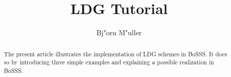 \documentclass[11pt,twoside,a4paper]{fdyartcl}
\title{LDG Tutorial}
\author{Bj"orn M"uller}
\begin{document}
\maketitle

\begin{abstract}
The present article illustrates the implementation of LDG schemes in BoSSS. It
does so by introducing three simple examples and explaining a possible 
realization in BoSSS.
\end{abstract}






\end{document}
